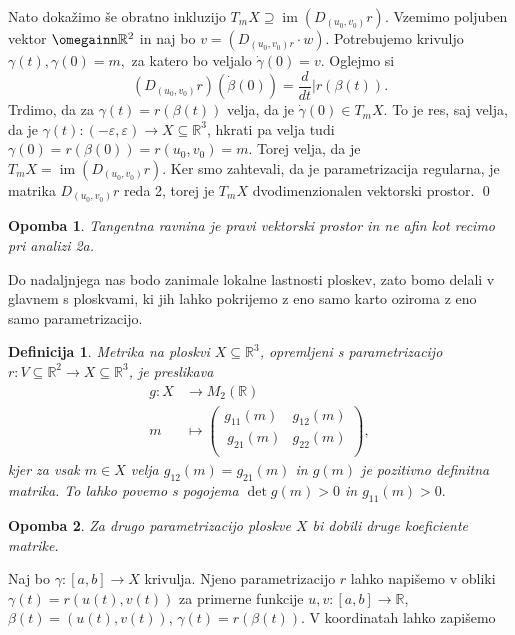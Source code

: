\documentclass[10pt, a4paper]{article}
\newtheorem{defi}[izr]{Definicija}
\newenvironment{noticeB}{%
  \tcolorbox[%
  notitle,
  empty,
  enhanced,  %
  breakable,
  coltext=black,
  colback=white, 
  fontupper=\rmfamily,
  noparskip,
  sharp corners,
  boxrule=-1pt,  %
  frame hidden,
  left=7pt,  %
  right=7pt,
  top=5pt,
  bottom=5pt,
  before skip=2.5ex plus 2pt,
  after skip=2.5ex plus 2pt,
  borderline west = {1.5pt}{-0.1pt}{blue!30!black}, %
  overlay unbroken and last={%
    \draw[color=black, line width=1.25pt]
    ($(frame.south west)+(1.pt, -0.1pt)$) -- ++(2em, 0);
  }
  ]}
{\endtcolorbox}
\newenvironment{definicija}{\begin{noticeB}\begin{defi}}{%
\end{defi}\end{noticeB}}
\newtheorem*{opomba}{Opomba}
\begin{document}
Nato dokažimo še obratno inkluzijo $T_mX \supseteq
\operatorname{im} \left( D_{(u_0, v_0)}r \right)$. Vzemimo poljuben
vektor $\omegainn \mathbb{R}^2$ in naj bo $v = \left( D_{(u_0,
v_0)r} \cdot w \right)$. Potrebujemo krivuljo $\gamma(t),
\gamma(0) = m,$ za katero bo veljalo $\dot{\gamma} (0) = v.$
Oglejmo si \[ \left( D_{(u_0, v_0)}r \right)(\dot{\beta} (0)) =
\frac{d}{dt} \big| r(\beta(t)). \]  Trdimo, da za $\gamma(t) =
r(\beta(t))$  velja, da je $\dot{\gamma}(0) \in  T_mX.$ To
je res, saj velja, da je $\gamma(t): (-\varepsilon,
\varepsilon)\to  X \subseteq \mathbb{R}^3$, hkrati pa velja
tudi $\gamma(0) = r(\beta(0) )= r(u_0, v_0) = m$. Torej velja,
da je $T_mX = \operatorname{im}(D_{(u_0,v_0)}r)$. Ker smo zahtevali,
da je parametrizacija regularna, je matrika $D_{(u_0,v_0)}r$ reda 2,
torej je  $T_mX$ dvodimenzionalen vektorski prostor.   \qed

\begin{opomba}
 Tangentna ravnina je pravi vektorski prostor in ne afin kot
 recimo pri analizi 2a.
\end{opomba}

Do nadaljnjega nas bodo zanimale lokalne lastnosti ploskev, zato bomo
delali v glavnem s ploskvami, ki jih lahko pokrijemo z eno samo karto
oziroma z eno samo parametrizacijo.

\begin{definicija}
\label{def_metrika_na_ploskvi}
 Metrika na ploskvi $X \subseteq  \mathbb{R}^3$, opremljeni s
 parametrizacijo $r: V \subseteq  \mathbb{R}^2 \to  X \subseteq
 \mathbb{R}^3$, je preslikava \begin{align*}
 	g: X &\longrightarrow M_2(\mathbb{R}) \\
 	m &\longmapsto 
	\begin{pmatrix}
		g_{11}(m) & g_{12}(m) \\\
		g_{21}(m) & g_{22}(m) \\
	\end{pmatrix},
 \end{align*}
 kjer za vsak $m \in  X$ velja $g_{12}(m) = g_{21}(m)$ in
 $g(m)$ je pozitivno definitna matrika. To lahko povemo s pogojema
 $\det g(m) > 0$ in $g_{11}(m) >0.$

\end{definicija}
\begin{opomba}
 Za drugo parametrizacijo ploskve $X$ bi dobili druge koeficiente
 matrike.
\end{opomba}
 Naj bo $\gamma: [a,b] \to  X$ krivulja. Njeno parametrizacijo $r$
lahko napišemo v obliki  $\gamma(t) = r(u(t), v(t))$ za primerne
funkcije $u,v : [a,b] \to \mathbb{R}$, $\beta(t) = (u(t), v(t))$,
$\gamma(t) = r(\beta(t)).$ V koordinatah lahko zapišemo 
\end{document}
